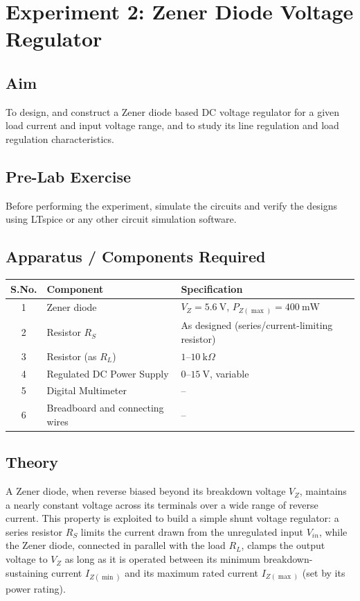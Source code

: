 
\chapter{Experiment 2: Zener Diode Voltage Regulator}

\section{Aim}
To design, and construct a Zener diode based DC voltage regulator for a given load current and input voltage range, and to study its line regulation
and load regulation characteristics.
\section{Pre-Lab Exercise}
Before performing the experiment, simulate the circuits and verify the designs using LTspice or any other circuit simulation software. 
\section{Apparatus / Components Required}
\begin{center}
	\begin{tabular}{@{}cll@{}}
		\toprule
		S.No. & Component & Specification \\
		\midrule
		1 & Zener diode & $V_Z = 5.6\ \text{V}$, $P_{Z(\max)} = 400\ \text{mW}$ \\
		2 & Resistor $R_S$ & As designed (series/current-limiting resistor) \\
		3 & Resistor (as $R_L$) & $1$--$10\ \text{k}\Omega$ \\
		4 & Regulated DC Power Supply & $0$--$15\ \text{V}$, variable \\
		5 & Digital Multimeter & -- \\
		6 & Breadboard and connecting wires & -- \\
		\bottomrule
	\end{tabular}
\end{center}

\section{Theory}
A Zener diode, when reverse biased beyond its breakdown voltage $V_Z$, maintains
a nearly constant voltage across its terminals over a wide range of reverse
current. This property is exploited to build a simple shunt voltage regulator:
a series resistor $R_S$ limits the current drawn from the unregulated input
$V_{in}$, while the Zener diode, connected in parallel with the load $R_L$,
clamps the output voltage to $V_Z$ as long as it is operated between its
minimum breakdown-sustaining current $I_{Z(\min)}$ and its maximum
rated current $I_{Z(\max)}$ (set by its power rating).

